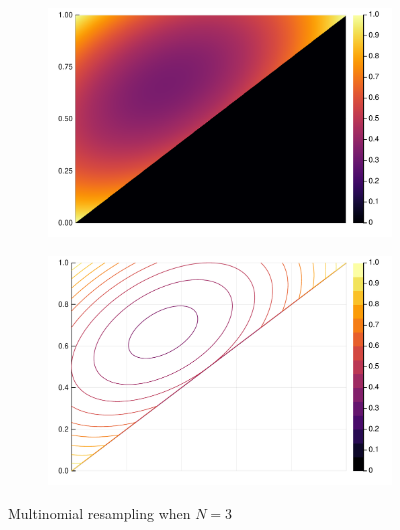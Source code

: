 \documentclass[fleqn]{article}
\theoremstyle{definition}
\begin{document}
\begin{figure}
	\begin{subfigure}{0.49\textwidth}
		\includegraphics[width=\textwidth]{plots/EcN_mn_N3_heatmap.pdf}
	\end{subfigure}
	\hfill
	\begin{subfigure}{0.49\textwidth}
		\includegraphics[width=\textwidth]{plots/EcN_mn_N3_contour.pdf}
	\end{subfigure}
	\caption{Multinomial resampling when $N=3$}
\end{figure}
\end{document}
